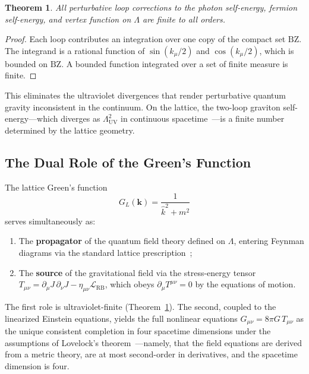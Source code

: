 \documentclass[12pt,a4paper]{article}
\newtheorem{theorem}{Theorem}[section]
\begin{document}
\begin{theorem}\label{thm:uv}
All perturbative loop corrections to the photon self-energy, fermion self-energy, and vertex function on $\Lambda$ are finite to all orders.
\end{theorem}

\begin{proof}
Each loop contributes an integration over one copy of the compact set $\mathrm{BZ}$. The integrand is a rational function of $\sin(k_{\mu}/2)$ and $\cos(k_{\mu}/2)$, which is bounded on $\mathrm{BZ}$. A bounded function integrated over a set of finite measure is finite.
\end{proof}

\noindent This eliminates the ultraviolet divergences that render perturbative quantum gravity inconsistent in the continuum. On the lattice, the two-loop graviton self-energy---which diverges as $\Lambda_{\mathrm{UV}}^{2}$ in continuous spacetime~\cite{GoroffSagnotti}---is a finite number determined by the lattice geometry.

\subsection{The Dual Role of the Green's Function}

The lattice Green's function
\begin{equation}\label{eq:green}
G_{L}(\mathbf{k}) = \frac{1}{\hat{k}^{2} + m^{2}}
\end{equation}
serves simultaneously as:
\begin{enumerate}
\item The \textbf{propagator} of the quantum field theory defined on $\Lambda$, entering Feynman diagrams via the standard lattice prescription~\cite{Wilson};
\item The \textbf{source} of the gravitational field via the stress-energy tensor $T_{\mu\nu} = \partial_{\mu}J\,\partial_{\nu}J - \eta_{\mu\nu}\mathcal{L}_{\mathrm{RB}}$, which obeys $\partial_{\mu}T^{\mu\nu} = 0$ by the equations of motion.
\end{enumerate}
The first role is ultraviolet-finite (Theorem~\ref{thm:uv}). The second, coupled to the linearized Einstein equations, yields the full nonlinear equations $G_{\mu\nu} = 8\pi G\,T_{\mu\nu}$ as the unique consistent completion in four spacetime dimensions under the assumptions of Lovelock's theorem~\cite{Lovelock}---namely, that the field equations are derived from a metric theory, are at most second-order in derivatives, and the spacetime dimension is four.
\end{document}
